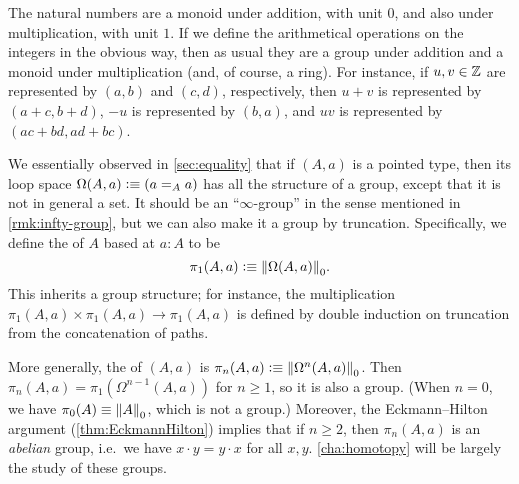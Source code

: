 \documentclass[hott-all.tex]{subfiles}
\begin{document}
% 
\begin{eg}
  The natural numbers \N are a monoid under addition, with unit $0$, and also under multiplication, with unit $1$.
  If we define the arithmetical operations on the integers \Z in the obvious way, then as usual they are a group under addition and a monoid under multiplication (and, of course, a ring).
  For instance, if $u, v \in \Z$ are represented by $(a,b)$ and $(c,d)$, respectively, then $u + v$ is represented by $(a + c, b + d)$, $-u$ is represented by $(b, a)$, and $u v$ is represented by $(a c + b d, a d + b c)$.
\end{eg}
% 
\begin{eg}
  We essentially observed in \cref{sec:equality} that if $(A,a)$ is a pointed type, then its loop space $\Omega(A,a)\defeq (\id[A]aa)$ has all the structure of a group, except that it is not in general a set.
  It should be an ``$\infty$-group'' in the sense mentioned in \cref{rmk:infty-group}, but we can also make it a group by truncation.
  Specifically, we define the 
  of $A$ based at $a:A$ to be
  \[\pi_1(A,a)\defeq \trunc0{\Omega(A,a)}.\]
  This inherits a group structure; for instance, the multiplication $\pi_1(A,a) \times \pi_1(A,a) \to \pi_1(A,a)$ is defined by double induction on truncation from the concatenation of paths.

  More generally, the 
  of $(A,a)$ is $\pi_n(A,a)\defeq \trunc0{\Omega^n(A,a)}$.
  Then $\pi_n(A,a) = \pi_1(\Omega^{n-1}(A,a))$ for $n\ge 1$, so it is also a group.
  (When $n=0$, we have $\pi_0(A) \jdeq \trunc0 A$, which is not a group.)
  Moreover, the Eckmann--Hilton argument  (\cref{thm:EckmannHilton}) implies that if $n\ge 2$, then $\pi_n(A,a)$ is an \emph{abelian} group, i.e.\ we have $x\cdot y = y\cdot x$ for all $x,y$.
  \cref{cha:homotopy} will be largely the study of these groups.
\end{eg}
% 
\end{document}
